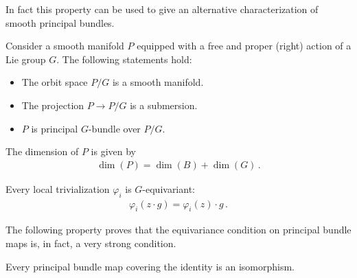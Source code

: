     In fact this property can be used to give an alternative characterization of smooth principal bundles.
    \begin{property}\label{bundle:quotient_manifold_theorem}
        Consider a smooth manifold $P$ equipped with a free and proper (right) action of a Lie group $G$. The following statements hold:
        \begin{itemize}
            \item The orbit space $P/G$ is a smooth manifold.
            \item The projection $P\rightarrow P/G$ is a submersion.
            \item $P$ is principal $G$-bundle over $P/G$.
        \end{itemize}
    \end{property}

    \begin{property}[Dimension]\label{bundle:principal_bundle_dimension}
        The dimension of $P$ is given by
        \begin{gather}
            \dim(P) = \dim(B) + \dim(G)\,.
        \end{gather}
    \end{property}

    \begin{property}
        Every local trivialization $\varphi_i$ is $G$-equivariant:
        \begin{gather}
            \varphi_i(z\cdot g) = \varphi_i(z)\cdot g\,.
        \end{gather}
    \end{property}


    The following property proves that the equivariance condition on principal bundle maps is, in fact, a very strong condition.
    \begin{property}
        Every principal bundle map covering the identity is an isomorphism.
    \end{property}

